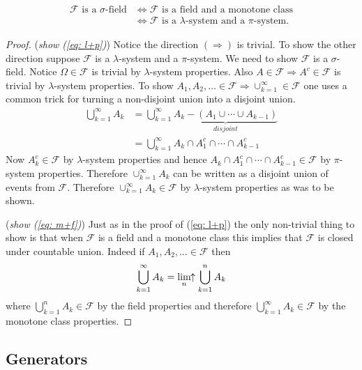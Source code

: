 \begin{theorem}[{\bf $\sigma = \lambda+\pi = \mathscr M + f$ }]
\begin{align}
\text{$\mathcal F$ is a $\sigma$-field}
&\Longleftrightarrow  \text{$\mathcal F$ is a field and a monotone class} \label{eq: m+f}\\
&\Longleftrightarrow  \text{$\mathcal F$ is a $\lambda$-system and a $\pi$-system.} \label{eq: l+p}
 \end{align}
\end{theorem}
\begin{proof}
({\sl show (\ref{eq: l+p})}) Notice the direction $(\Longrightarrow)$ is trivial. To show the other direction suppose $\mathcal F$ is a $\lambda$-system and a $\pi$-system. We need to show $\mathcal F$ is a $\sigma$-field. Notice $\Omega\in \mathcal F$ is trivial by $\lambda$-system properties. Also $A\in \mathcal F\Rightarrow A^c\in \mathcal F$ is trivial by $\lambda$-system properties. To show $A_1, A_2, \ldots \in \mathcal F\Rightarrow \cup_{k=1}^\infty\in \mathcal F$ one uses a common trick for turning a non-disjoint union into a disjoint union.
\begin{align*}
\bigcup_{k=1}^\infty A_k &= \bigcup_{k=1}^\infty \underbrace{A_k - (A_1\cup \cdots \cup A_{k-1})}_{disjoint} \\
 &= \bigcup_{k=1}^\infty A_k \cap A_1^c \cap \cdots \cap A_{k-1}^c
\end{align*}
Now $A_k^c \in \mathcal F$ by $\lambda$-system properties and hence $ A_k \cap A_1^c \cap \cdots \cap A_{k-1}^c\in \mathcal F$ by $\pi$-system properties. Therefore $\cup_{k=1}^\infty A_k$ can be written as a disjoint union of events from $\mathcal F$. Therefore $\cup_{k=1}^\infty A_k\in \mathcal F$ by $\lambda$-system properties as was to be shown.


({\sl show (\ref{eq: m+f})}) Just as in the proof of (\ref{eq: l+p}) the only non-trivial thing to show is that when $\mathcal F$ is a field and a monotone class this implies that $\mathcal F$ is closed under countable union. Indeed if $A_1, A_2, \ldots \in \mathcal F$ then
\[
\bigcup_{k=1}^\infty A_k = \displaystyle\lim_{n}\!\!\uparrow {\bigcup_{k=1}^n A_k}
\]
where ${\bigcup_{k=1}^n A_k}\in \mathcal F$ by the field properties and therefore $\bigcup_{k=1}^\infty A_k \in \mathcal F$ by the monotone class properties.

\end{proof}


\subsection{Generators}



